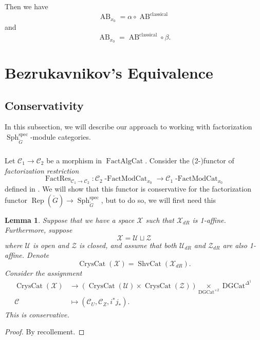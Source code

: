 \documentclass[10pt,a4paper]{amsart}
\newtheorem{lem}[subsubsection]{Lemma}
\newcommand{\on}[1]{\operatorname{#1}}
\newcommand{\Gcheck}{\check{G}}
\newcommand{\FactAlgCat}{\on{FactAlgCat}}
\newcommand{\sssec}[1]{\subsubsection{}}
\begin{document}
Then we have
$$
\on{AB}_{x_0} = \alpha \circ \on{AB}^{\on{classical}}
$$
and
$$
\on{AB}_{x_0} = \on{AB}^{\on{classical}} \circ \beta.
$$

\section{Bezrukavnikov's Equivalence} \label{Section B}
\subsection{Conservativity} \label{Conservativity}
In this subsection, we will describe our approach to working with factorization $\on{Sph}_{\Gcheck}^{\on{spec}}$-module categories.

\sssec{}
Let $\mathcal{C}_1 \to \mathcal{C}_2$ be a morphism in $\FactAlgCat$. Consider the (2-)functor of \emph{factorization restriction}
$$
\on{FactRes}_{\mathcal{C}_1 \to \mathcal{C}_2} : \mathcal{C}_2 \on{-FactModCat}_{x_0} \longrightarrow \mathcal{C}_1 \on{-FactModCat}_{x_0}
$$
defined in \cite{CF}. We will show that this functor is conservative for the factorization functor $\on{Rep}(\Gcheck) \to \on{Sph}_{\Gcheck}^{\on{spec}}$, but to do so, we will first need this

\begin{lem}
    Suppose that we have a space $\mathcal{X}$ such that $\mathcal{X}_{dR}$ is 1-affine. Furthermore, suppose 
    $$
    \mathcal{X} = \mathcal{U} \sqcup \mathcal{Z}
    $$
    where $\mathcal{U}$ is open and $\mathcal{Z}$ is closed, and assume that both $\mathcal{U}_{dR}$ and $\mathcal{Z}_{dR}$ are also 1-affine.
    Denote 
    $$
    \on{CrysCat}(\mathcal{X}) = \on{ShvCat}(\mathcal{X}_{dR}).
    $$
    Consider the assignment
    \begin{align}
    \on{CrysCat}(\mathcal{X}) &\longrightarrow (\on{CrysCat}(\mathcal{U}) \times \on{CrysCat}(\mathcal{Z})) \underset{\on{DGCat^{\times 2}}}{\times} \on{DGCat}^{\Delta^1} \\
    \mathcal{C} &\longmapsto (\mathcal{C}_U, \mathcal{C}_Z, i^*j_*).
    \end{align}
    This is conservative.
\end{lem}
\begin{proof}
    By recollement.
\end{proof}
\end{document}

